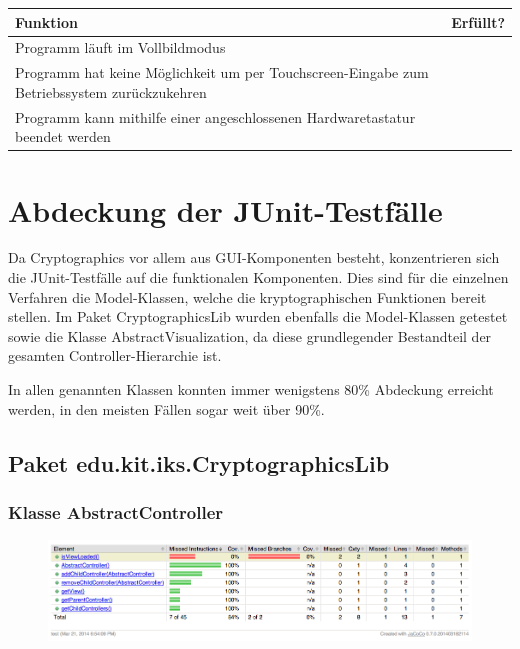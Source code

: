 \documentclass{article}
\newcommand{\cmark}{\ding{51}}
\begin{document}
    \begin{table}[H]
      \begin{tabularx}{\textwidth}{| >{\raggedright\arraybackslash}X | c |}
        \hline
        \textbf{Funktion} & \textbf{Erfüllt?} \\
        \hline
        Programm läuft im Vollbildmodus & \cmark \\
        \hline
        Programm hat keine Möglichkeit um per Touchscreen-Eingabe zum Betriebssystem zurückzukehren & \cmark \\
        \hline
        Programm kann mithilfe einer angeschlossenen Hardwaretastatur beendet werden & \cmark \\
        \hline
      \end{tabularx}
    \end{table}
\clearpage

\section{Abdeckung der JUnit-Testfälle}
  Da Cryptographics vor allem aus GUI-Komponenten besteht, konzentrieren sich die JUnit-Testfälle auf die
  funktionalen Komponenten. Dies sind für die einzelnen Verfahren die Model-Klassen, welche die kryptographischen
  Funktionen bereit stellen. Im Paket CryptographicsLib wurden ebenfalls die Model-Klassen getestet sowie die Klasse
  AbstractVisualization, da diese grundlegender Bestandteil der gesamten Controller-Hierarchie ist.

  In allen genannten Klassen konnten immer wenigstens 80\% Abdeckung erreicht werden, in den meisten Fällen sogar
  weit über 90\%.

  \subsection{Paket edu.kit.iks.CryptographicsLib}
    \subsubsection{Klasse AbstractController}
      \begin{figure}[H]
        \centering
          \includegraphics[width=\textwidth]{resources/coverage_lib_abstractcontroller}
      \end{figure}
\end{document}
